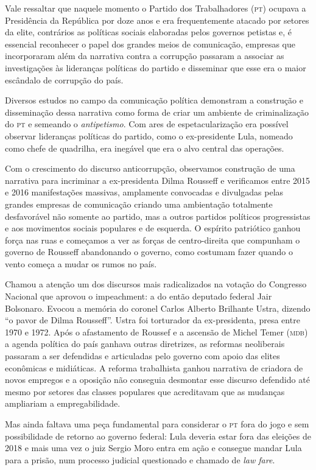 Vale ressaltar que naquele momento o Partido dos Trabalhadores (\textsc{pt})
ocupava a Presidência da República por doze anos e era frequentemente
atacado por setores da elite, contrários as políticas sociais elaboradas
pelos governos petistas e, é essencial reconhecer o papel dos grandes
meios de comunicação, empresas que incorporaram além da narrativa contra
a corrupção passaram a associar as investigações às lideranças políticas
do partido e disseminar que esse era o maior escândalo de corrupção do
país.

Diversos estudos no campo da comunicação política demonstram a
construção e disseminação dessa narrativa como forma de criar um
ambiente de criminalização do \textsc{pt} e semeando o
\textit{antipetismo}. Com ares de espetacularização era possível observar
lideranças políticas do partido, como o ex-presidente Lula, nomeado como
chefe de quadrilha, era inegável que era o alvo central das operações.

Com o crescimento do discurso anticorrupção, observamos construção de
uma narrativa para incriminar a ex-presidenta Dilma Rousseff e
verificamos entre 2015 e 2016 manifestações massivas, amplamente
convocadas e divulgadas pelas grandes empresas de comunicação criando
uma ambientação totalmente desfavorável não somente ao partido, mas a
outros partidos políticos progressistas e aos movimentos sociais
populares e de esquerda. O espírito patriótico ganhou força nas ruas e
começamos a ver as forças de centro-direita que compunham o governo de
Rousseff abandonando o governo, como costumam fazer quando o vento
começa a mudar os rumos no país.

Chamou a atenção um dos discursos mais radicalizados na votação do
Congresso Nacional que aprovou o impeachment: a do então deputado
federal Jair Bolsonaro. Evocou a memória do coronel Carlos Alberto
Brilhante Ustra, dizendo ``o pavor de Dilma Rousseff''. Ustra foi
torturador da ex-presidenta, presa entre 1970 e 1972. Após o afastamento
de Roussef e a ascensão de Michel Temer (\textsc{mdb}) a agenda política do país
ganhava outras diretrizes, as reformas neoliberais passaram a ser
defendidas e articuladas pelo governo com apoio das elites econômicas e
midiáticas. A reforma trabalhista ganhou narrativa de criadora de novos
empregos e a oposição não conseguia desmontar esse discurso defendido
até mesmo por setores das classes populares que acreditavam que as
mudanças ampliariam a empregabilidade.

Mas ainda faltava uma peça fundamental para considerar o \textsc{pt} fora do jogo
e sem possibilidade de retorno ao governo federal: Lula deveria estar
fora das eleições de 2018 e mais uma vez o juiz Sergio Moro entra em
ação e consegue mandar Lula para a prisão, num processo judicial
questionado e chamado de \textit{law fare}.

